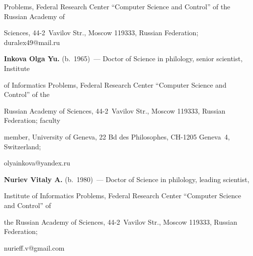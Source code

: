 Problems, Federal Research Center ``Computer Science and Control'' of the Russian Academy of 


Sciences, 44-2~Vavilov Str., Moscow 119333, Russian Federation; \mbox{duralex49@mail.ru}





\vspace*{3pt}





\noindent


\textbf{Inkova Olga Yu.} (b.\ 1965)~--- Doctor of Science in philology, senior scientist, Institute 


of Informatics Problems, Federal Research Center ``Computer Science and Control'' of the 


Russian Academy of Sciences, 44-2~Vavilov Str., Moscow 119333, Russian Federation; faculty 


member, University of Geneva, 22 Bd des Philosophes, CH-1205 Geneva~4, Switzerland; 


\mbox{olyainkova@yandex.ru}





\vspace*{3pt}





\noindent


\textbf{Nuriev Vitaly A.} (b.\ 1980)~--- Doctor of Science in philology, leading scientist, 


Institute of Informatics Problems, Federal Research Center ``Computer Science and Control'' of 


the Russian Academy of Sciences, 44-2~Vavilov Str., Moscow 119333, Russian Federation; 


\mbox{nurieff.v@gmail.com}








\label{end\stat}





\renewcommand{\bibname}{\protect\rm Литература} 


